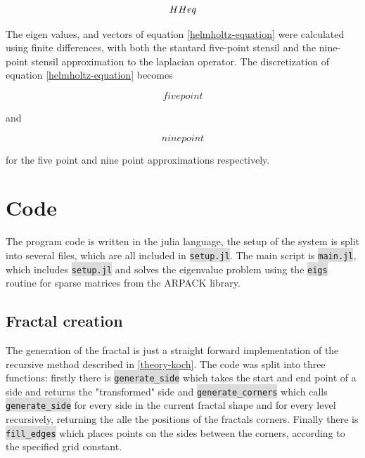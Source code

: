 \documentclass{article}
\begin{document}
\begin{equation}
    HHeq \\
\end{equation}

The eigen values, and vectors of equation \ref{helmholtz-equation} were calculated using finite differences, with both the stantard five-point stensil and the nine-point stensil approximation to the laplacian operator. The discretization of equation \ref{helmholtz-equation} becomes

\begin{equation}
    five point
\end{equation}

and

\begin{equation}
    nine point
\end{equation}

for the five point and nine point approximations respectively.

\section{Code}
The program code is written in the julia language, the setup of the system is split into several files, which are all included in \colorbox{gainsboro}{\lstinline{setup.jl}}. The main script is \colorbox{gainsboro}{\lstinline{main.jl}}, which includes \colorbox{gainsboro}{\lstinline{setup.jl}} and solves the eigenvalue problem using the \colorbox{gainsboro}{\lstinline{eigs}} routine for sparse matrices from the ARPACK library.\\

\subsection{Fractal creation}\label{code:fractal}
The generation of the fractal is just a straight forward implementation of the recursive method described in \ref{theory-koch}. The code was split into three functions: firstly there is \colorbox{gainsboro}{\lstinline{generate_side}} which takes the start and end point of a side and returns the "transformed" side and \colorbox{gainsboro}{\lstinline{generate_corners}} which calls \colorbox{gainsboro}{\lstinline{generate_side}} for every side in the current fractal shape and for every level recursively, returning the alle the positions of the fractals corners.
Finally there is \colorbox{gainsboro}{\lstinline{fill_edges}} which places points on the sides between the corners, according to the specified grid constant.\\
\end{document}
